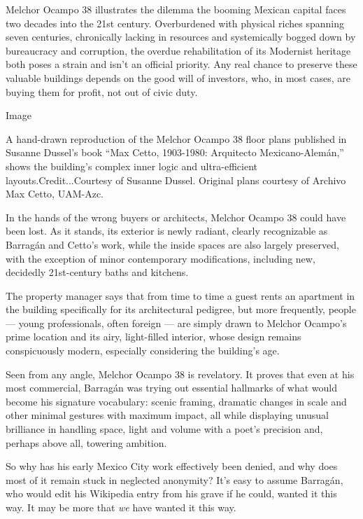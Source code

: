 Melchor Ocampo 38 illustrates the dilemma the booming Mexican capital
faces two decades into the 21st century. Overburdened with physical
riches spanning seven centuries, chronically lacking in resources and
systemically bogged down by bureaucracy and corruption, the overdue
rehabilitation of its Modernist heritage both poses a strain and isn't
an official priority. Any real chance to preserve these valuable
buildings depends on the good will of investors, who, in most cases, are
buying them for profit, not out of civic duty.

Image

A hand-drawn reproduction of the Melchor Ocampo 38 floor plans published
in Susanne Dussel's book ``Max Cetto, 1903-1980: Arquitecto
Mexicano-Alemán,'' shows the building's complex inner logic and
ultra-efficient layouts.Credit...Courtesy of Susanne Dussel. Original
plans courtesy of Archivo Max Cetto, UAM-Azc.

In the hands of the wrong buyers or architects, Melchor Ocampo 38 could
have been lost. As it stands, its exterior is newly radiant, clearly
recognizable as Barragán and Cetto's work, while the inside spaces are
also largely preserved, with the exception of minor contemporary
modifications, including new, decidedly 21st-century baths and kitchens.

The property manager says that from time to time a guest rents an
apartment in the building specifically for its architectural pedigree,
but more frequently, people --- young professionals, often foreign ---
are simply drawn to Melchor Ocampo's prime location and its airy,
light-filled interior, whose design remains conspicuously modern,
especially considering the building's age.

Seen from any angle, Melchor Ocampo 38 is revelatory. It proves that
even at his most commercial, Barragán was trying out essential hallmarks
of what would become his signature vocabulary: scenic framing, dramatic
changes in scale and other minimal gestures with maximum impact, all
while displaying unusual brilliance in handling space, light and volume
with a poet's precision and, perhaps above all, towering ambition.

So why has his early Mexico City work effectively been denied, and why
does most of it remain stuck in neglected anonymity? It's easy to assume
Barragán, who would edit his Wikipedia entry from his grave if he could,
wanted it this way. It may be more that \emph{we} have wanted it this
way.


